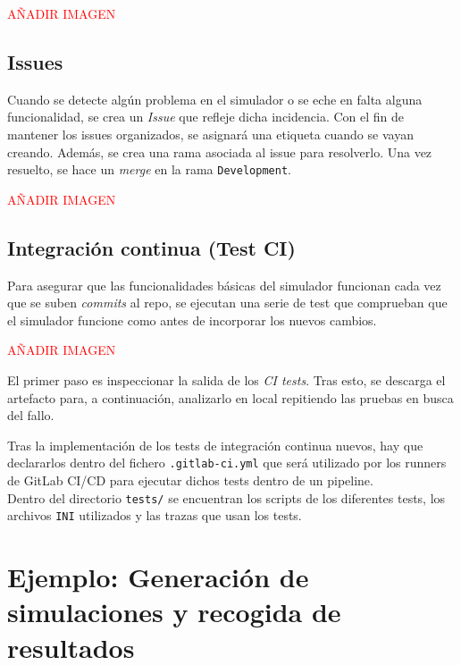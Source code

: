 \textcolor{red}{AÑADIR IMAGEN}

\subsection{Issues}
Cuando se detecte algún problema en el simulador o se eche en falta alguna funcionalidad, se crea un \emph{Issue} que refleje dicha incidencia. Con el fin de mantener los issues organizados, se asignará una etiqueta cuando se vayan creando. Además, se crea una rama asociada al issue para resolverlo. Una vez resuelto, se hace un \emph{merge} en la rama \verb|Development|.

\textcolor{red}{AÑADIR IMAGEN}

\subsection{Integración continua (Test CI)}
Para asegurar que las funcionalidades básicas del simulador funcionan cada vez que se suben \emph{commits} al repo, se ejecutan una serie de test que comprueban que el simulador funcione como antes de incorporar los nuevos cambios.

\textcolor{red}{AÑADIR IMAGEN}

\begin{aclaracion}
        El primer paso es inspeccionar la salida de los \emph{CI tests}. Tras esto, se descarga el artefacto para, a continuación, analizarlo en local repitiendo las pruebas en busca del fallo.
\end{aclaracion}

Tras la implementación de los tests de integración continua nuevos, hay que declararlos dentro del fichero \verb|.gitlab-ci.yml| que será utilizado por los runners de GitLab CI/CD para ejecutar dichos tests dentro de un pipeline.\\

Dentro del directorio \verb|tests/| se encuentran los scripts de los diferentes tests, los archivos \verb|INI| utilizados y las trazas que usan los tests.


\section{Ejemplo: Generación de simulaciones y recogida de resultados}

